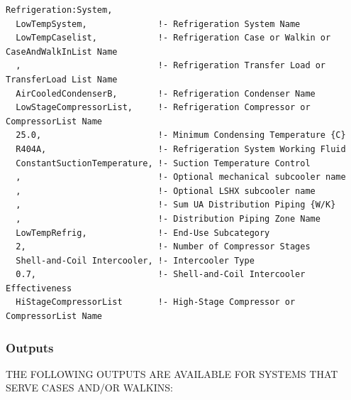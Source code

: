 \begin{lstlisting}
Refrigeration:System,
  LowTempSystem,              !- Refrigeration System Name
  LowTempCaselist,            !- Refrigeration Case or Walkin or CaseAndWalkInList Name
  ,                           !- Refrigeration Transfer Load or TransferLoad List Name
  AirCooledCondenserB,        !- Refrigeration Condenser Name
  LowStageCompressorList,     !- Refrigeration Compressor or CompressorList Name
  25.0,                       !- Minimum Condensing Temperature {C}
  R404A,                      !- Refrigeration System Working Fluid
  ConstantSuctionTemperature, !- Suction Temperature Control
  ,                           !- Optional mechanical subcooler name
  ,                           !- Optional LSHX subcooler name
  ,                           !- Sum UA Distribution Piping {W/K}
  ,                           !- Distribution Piping Zone Name
  LowTempRefrig,              !- End-Use Subcategory
  2,                          !- Number of Compressor Stages
  Shell-and-Coil Intercooler, !- Intercooler Type
  0.7,                        !- Shell-and-Coil Intercooler Effectiveness
  HiStageCompressorList       !- High-Stage Compressor or CompressorList Name
\end{lstlisting}

\subsubsection{Outputs}\label{outputs-2-018}

THE FOLLOWING OUTPUTS ARE AVAILABLE FOR SYSTEMS THAT SERVE CASES AND/OR WALKINS:

